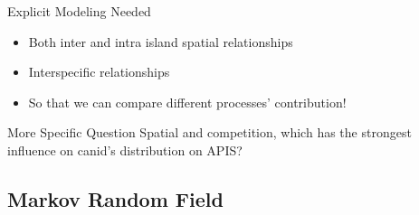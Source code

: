\documentclass{beamer}
\begin{document}
\begin{frame}{Explicit Modeling Needed}
	\begin{itemize}
		\item Both inter and intra island spatial relationships
		\item Interspecific relationships
		\item So that we can compare different processes' contribution!
	\end{itemize}
\end{frame}

\begin{frame}{More Specific Question}
	Spatial and competition, which has the strongest influence on canid's distribution on APIS?
\end{frame}


\subsection{Markov Random Field}
\end{document}
